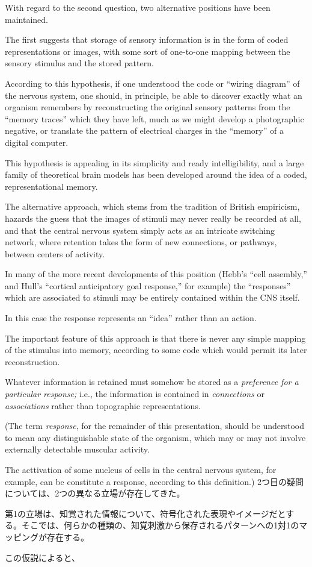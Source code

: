 \documentclass[uplatex,dvipdfmx]{jsarticle} \usepackage{amsmath,amssymb,bm}
\begin{document}
\vspace{\baselineskip}
\begin{paracol}{2}
With regard to the second question, two alternative positions have been maintained.

The first suggests that storage of sensory information is in the form of coded representations or images, with some sort of one-to-one mapping between the sensory stimulus and the stored pattern.

According to this hypothesis, if one understood the code or ``wiring diagram'' of the nervous system, one should, in principle, be able to discover exactly what an organism remembers by reconstructing the original sensory patterns from the ``memory traces'' which they have left, much as we might develop a photographic negative, or translate the pattern of electrical charges in the ``memory'' of a digital computer.

This hypothesis is appealing in its simplicity and ready intelligibility, and a large family of theoretical brain models has been developed around the idea of a coded, representational memory.

The alternative approach, which stems from the tradition of British empiricism, hazards the guess that the images of stimuli may never really be recorded at all, and that the central nervous system simply acts as an intricate switching network, where retention takes the form of new connections, or pathways, between centers of activity.

In many of the more recent developments of this position (Hebb's ``cell assembly,'' and Hull's ``cortical anticipatory goal response,'' for example) the ``responses'' which are associated to stimuli may be entirely contained within the CNS itself.

In this case the response represents an ``idea'' rather than an action.

The important feature of this approach is that there is never any simple mapping of the stimulus into memory, according to some code which would permit its later reconstruction.

Whatever information is retained must somehow be stored as a {\it preference for a particular response;} i.e., the information is contained in {\it connections} or {\it associations} rather than topographic representations.

(The term {\it response}, for the remainder of this presentation, should be understood to mean any distinguishable state of the organism, which may or may not involve externally detectable muscular activity.

The acttivation of some nucleus of cells in the central nervous system, for example, can be constitute a response, according to this definition.)
\switchcolumn
2つ目の疑問については、2つの異なる立場が存在してきた。

第1の立場は、知覚された情報について、符号化された表現やイメージだとする。そこでは、何らかの種類の、知覚刺激から保存されるパターンへの1対1のマッピングが存在する。

この仮説によると、
\end{paracol}





\vspace{\baselineskip}
\begin{paracol}{2}
\switchcolumn
\end{paracol}
\end{document}
